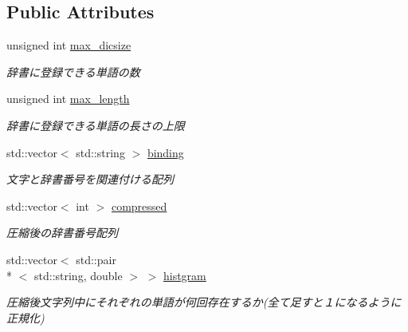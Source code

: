 \subsection*{Public Attributes}
\begin{DoxyCompactItemize}
\item 
unsigned int \hyperlink{classprdc__lzw_1_1Dictionary_a27f3bda2d7baeb3c7a62db57de66ffb7}{max\-\_\-dicsize}
\begin{DoxyCompactList}\small\item\em 辞書に登録できる単語の数 \end{DoxyCompactList}\item 
unsigned int \hyperlink{classprdc__lzw_1_1Dictionary_a1545e7874d133c508cd3e40f3c150b90}{max\-\_\-length}
\begin{DoxyCompactList}\small\item\em 辞書に登録できる単語の長さの上限 \end{DoxyCompactList}\item 
std\-::vector$<$ std\-::string $>$ \hyperlink{classprdc__lzw_1_1Dictionary_af5c7156370b9ee5d0e060624d409bce1}{binding}
\begin{DoxyCompactList}\small\item\em 文字と辞書番号を関連付ける配列 \end{DoxyCompactList}\item 
std\-::vector$<$ int $>$ \hyperlink{classprdc__lzw_1_1Dictionary_a18e15168c7acd82f062141627e5a8b75}{compressed}
\begin{DoxyCompactList}\small\item\em 圧縮後の辞書番号配列 \end{DoxyCompactList}\item 
std\-::vector$<$ std\-::pair\\*
$<$ std\-::string, double $>$ $>$ \hyperlink{classprdc__lzw_1_1Dictionary_a10f2b395d4021c26d500bf328c7839ac}{histgram}
\begin{DoxyCompactList}\small\item\em 圧縮後文字列中にそれぞれの単語が何回存在するか(全て足すと１になるように正規化) \end{DoxyCompactList}\end{DoxyCompactItemize}
